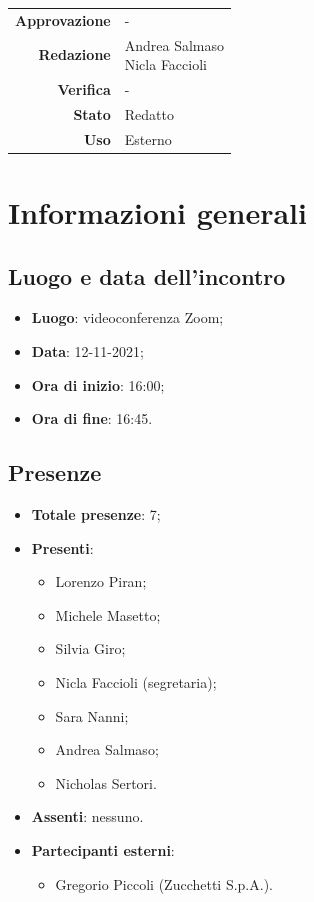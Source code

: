 \documentclass[11pt]{article}
\begin{document}
\begin{titlepage}
\begin{center}
			\large
			
			
			\vfill
			
			\begin{tabular}{r|l}
				\textbf{Approvazione} &  -\\
				\textbf{Redazione} &  \parbox[t]{3.5cm}{Andrea Salmaso \\Nicla Faccioli}\\
				\textbf{Verifica} &  -\\
				\textbf{Stato} & Redatto \\
				\textbf{Uso} & Esterno
			\end{tabular}
			\vfill
			
		\end{center}
	\end{titlepage}

	\newpage

	\section{Informazioni generali}
	\subsection{Luogo e data dell'incontro}
	\begin{itemize}
		\item \textbf{Luogo}: videoconferenza Zoom;
		\item \textbf{Data}: 12-11-2021;
		\item \textbf{Ora di inizio}: 16:00;
		\item \textbf{Ora di fine}: 16:45.
	\end{itemize}
	
	\subsection{Presenze}
	\begin{itemize}
		\item \textbf{Totale presenze}: 7;
		\item \textbf{Presenti}:
		\begin{itemize}
			\item Lorenzo Piran;
			\item Michele Masetto;
			\item Silvia Giro;
			\item Nicla Faccioli (segretaria);
			\item Sara Nanni;
			\item Andrea Salmaso;
			\item Nicholas Sertori.
		\end{itemize}
		\item \textbf{Assenti}: nessuno.
		\item \textbf{Partecipanti esterni}:
		\begin{itemize}
			\item Gregorio Piccoli (Zucchetti S.p.A.).
		\end{itemize}
	\end{itemize}
\end{document}

